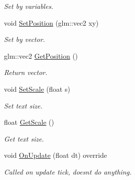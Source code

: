 \begin{DoxyCompactItemize}
\begin{DoxyCompactList}\small\item\em Set by variables. \end{DoxyCompactList}\item 
\mbox{\label{class_text_u_i_component_a69c924402ce18381aaf98e22b8ffe975}} 
void \mbox{\hyperlink{class_text_u_i_component_a69c924402ce18381aaf98e22b8ffe975}{Set\+Position}} (glm\+::vec2 xy)
\begin{DoxyCompactList}\small\item\em Set by vector. \end{DoxyCompactList}\item 
\mbox{\label{class_text_u_i_component_a9a149a41cd8f98204632cfa57cbd5ca6}} 
glm\+::vec2 \mbox{\hyperlink{class_text_u_i_component_a9a149a41cd8f98204632cfa57cbd5ca6}{Get\+Position}} ()
\begin{DoxyCompactList}\small\item\em Return vector. \end{DoxyCompactList}\item 
\mbox{\label{class_text_u_i_component_a19811b97b0a51afd3250096f5ea25f35}} 
void \mbox{\hyperlink{class_text_u_i_component_a19811b97b0a51afd3250096f5ea25f35}{Set\+Scale}} (float s)
\begin{DoxyCompactList}\small\item\em Set text size. \end{DoxyCompactList}\item 
\mbox{\label{class_text_u_i_component_a24b50b130650496d77050a8429c29658}} 
float \mbox{\hyperlink{class_text_u_i_component_a24b50b130650496d77050a8429c29658}{Get\+Scale}} ()
\begin{DoxyCompactList}\small\item\em Get text size. \end{DoxyCompactList}\item 
\mbox{\label{class_text_u_i_component_a7013fa585ef3300ef6968025da8b87ee}} 
void \mbox{\hyperlink{class_text_u_i_component_a7013fa585ef3300ef6968025da8b87ee}{On\+Update}} (float dt) override
\begin{DoxyCompactList}\small\item\em Called on update tick, doesn\textquotesingle{}t do anything. \end{DoxyCompactList}\item 

\end{DoxyCompactItemize}
